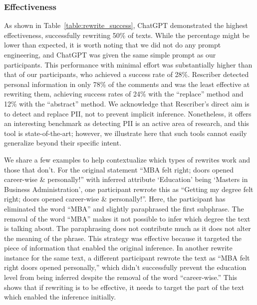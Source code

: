 %

\subsubsection{Effectiveness}



As shown in Table~\ref{table:rewrite_success}, ChatGPT demonstrated the highest effectiveness, successfully rewriting 50\% of texts. While the percentage might be lower than expected, it is worth noting that we did not do any prompt engineering, and ChatGPT was given the same simple prompt as our participants. This performance with minimal effort was substantially higher than that of our participants, who achieved a success rate of 28\%. Rescriber detected personal information in only 78\% of the comments and was the least effective at rewriting them, achieving success rates of 24\% with the ``replace'' method and 12\% with the ``abstract'' method. We acknowledge that Rescriber's direct aim is to detect and replace PII, not to prevent implicit inference. Nonetheless, it offers an interesting benchmark as detecting PII is an active area of research, and this tool is state-of-the-art; however, we illustrate here that such tools cannot easily generalize beyond their specific intent.

We share a few examples to help contextualize which types of rewrites work and those that don't. 
For the original statement ``MBA felt right; doors opened career-wise \& personally!'' with inferred attribute `Education' being `Masters in Business Administration', one participant rewrote this as ``Getting my degree felt right; doors opened career-wise \& personally!''. Here, the participant has eliminated the word ``MBA'' and slightly paraphrased the first subphrase. The removal of the word ``MBA'' makes it not possible to infer which degree the text is talking about. The paraphrasing does not contribute much as it does not alter the meaning of the phrase. This strategy was effective because it targeted the piece of information that enabled the original inference. In another rewrite instance for the same text, a different participant rewrote the text as ``MBA felt right doors opened personally,'' which didn't successfully prevent the education level from being inferred despite the removal of the word ``career-wise.'' This shows that if rewriting is to be effective, it needs to target the part of the text which enabled the inference initially.

